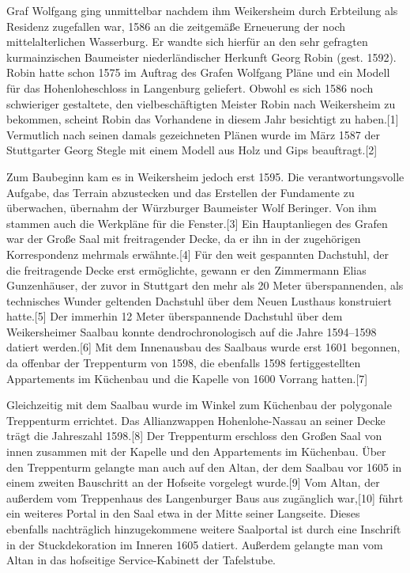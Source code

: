 \documentclass[
  letterpaper,
]{book}
\begin{document}
Graf Wolfgang ging unmittelbar nachdem ihm Weikersheim durch Erbteilung
als Residenz zugefallen war, 1586 an die zeitgemäße Erneuerung der noch
mittelalterlichen Wasserburg. Er wandte sich hierfür an den sehr
gefragten kurmainzischen Baumeister niederländischer Herkunft Georg
Robin (gest. 1592). Robin hatte schon 1575 im Auftrag des Grafen
Wolfgang Pläne und ein Modell für das Hohenloheschloss in Langenburg
geliefert. Obwohl es sich 1586 noch schwieriger gestaltete, den
vielbeschäftigten Meister Robin nach Weikersheim zu bekommen, scheint
Robin das Vorhandene in diesem Jahr besichtigt zu haben.{[}1{]}
Vermutlich nach seinen damals gezeichneten Plänen wurde im März 1587 der
Stuttgarter Georg Stegle mit einem Modell aus Holz und Gips
beauftragt.{[}2{]}

Zum Baubeginn kam es in Weikersheim jedoch erst 1595. Die
verantwortungsvolle Aufgabe, das Terrain abzustecken und das Erstellen
der Fundamente zu überwachen, übernahm der Würzburger Baumeister Wolf
Beringer. Von ihm stammen auch die Werkpläne für die Fenster.{[}3{]} Ein
Hauptanliegen des Grafen war der Große Saal mit freitragender Decke, da
er ihn in der zugehörigen Korrespondenz mehrmals erwähnte.{[}4{]} Für
den weit gespannten Dachstuhl, der die freitragende Decke erst
ermöglichte, gewann er den Zimmermann Elias Gunzenhäuser, der zuvor in
Stuttgart den mehr als 20 Meter überspannenden, als technisches Wunder
geltenden Dachstuhl über dem Neuen Lusthaus konstruiert hatte.{[}5{]}
Der immerhin 12 Meter überspannende Dachstuhl über dem Weikersheimer
Saalbau konnte dendrochronologisch auf die Jahre 1594--1598 datiert
werden.{[}6{]} Mit dem Innenausbau des Saalbaus wurde erst 1601
begonnen, da offenbar der Treppenturm von 1598, die ebenfalls 1598
fertiggestellten Appartements im Küchenbau und die Kapelle von 1600
Vorrang hatten.{[}7{]}

Gleichzeitig mit dem Saalbau wurde im Winkel zum Küchenbau der
polygonale Treppenturm errichtet. Das Allianzwappen Hohenlohe-Nassau an
seiner Decke trägt die Jahreszahl 1598.{[}8{]} Der Treppenturm erschloss
den Großen Saal von innen zusammen mit der Kapelle und den Appartements
im Küchenbau. Über den Treppenturm gelangte man auch auf den Altan, der
dem Saalbau vor 1605 in einem zweiten Bauschritt an der Hofseite
vorgelegt wurde.{[}9{]} Vom Altan, der außerdem vom Treppenhaus des
Langenburger Baus aus zugänglich war,{[}10{]} führt ein weiteres Portal
in den Saal etwa in der Mitte seiner Langseite. Dieses ebenfalls
nachträglich hinzugekommene weitere Saalportal ist durch eine Inschrift
in der Stuckdekoration im Inneren 1605 datiert. Außerdem gelangte man
vom Altan in das hofseitige Service-Kabinett der Tafelstube.
\end{document}
